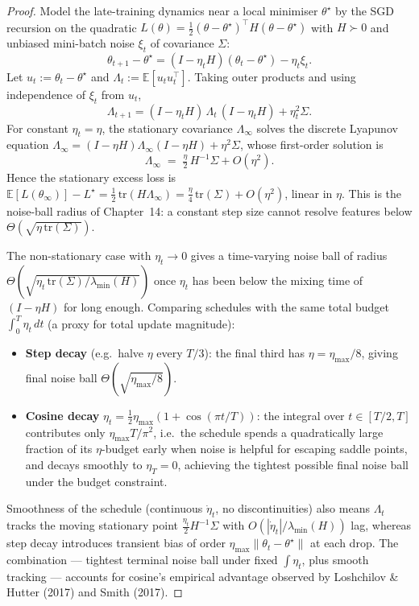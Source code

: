 \documentclass[11pt]{article}
\theoremstyle{remark}
\begin{document}
\begin{proof}
Model the late-training dynamics near a local minimiser $\theta^\star$ by the SGD recursion on the quadratic $L(\theta) = \tfrac{1}{2}(\theta - \theta^\star)^\top H (\theta - \theta^\star)$ with $H \succ 0$ and unbiased mini-batch noise $\xi_t$ of covariance $\Sigma$:
\[
  \theta_{t+1} - \theta^\star = (I - \eta_t H)(\theta_t - \theta^\star) - \eta_t \xi_t.
\]
Let $u_t := \theta_t - \theta^\star$ and $\Lambda_t := \mathbb{E}[u_t u_t^\top]$. Taking outer products and using independence of $\xi_t$ from $u_t$,
\[
  \Lambda_{t+1} = (I - \eta_t H)\, \Lambda_t\, (I - \eta_t H) + \eta_t^2 \Sigma.
\]
For constant $\eta_t = \eta$, the stationary covariance $\Lambda_\infty$ solves the discrete Lyapunov equation $\Lambda_\infty = (I-\eta H)\Lambda_\infty(I-\eta H) + \eta^2 \Sigma$, whose first-order solution is
\[
  \Lambda_\infty \;=\; \tfrac{\eta}{2}\, H^{-1} \Sigma + O(\eta^2).
\]
Hence the stationary excess loss is $\mathbb{E}[L(\theta_\infty)] - L^\star = \tfrac{1}{2}\,\mathrm{tr}(H \Lambda_\infty) = \tfrac{\eta}{4}\,\mathrm{tr}(\Sigma) + O(\eta^2)$, linear in $\eta$. This is the noise-ball radius of Chapter~14: a constant step size cannot resolve features below $\Theta(\sqrt{\eta\,\mathrm{tr}(\Sigma)})$.

The non-stationary case with $\eta_t \to 0$ gives a time-varying noise ball of radius $\Theta(\sqrt{\eta_t \,\mathrm{tr}(\Sigma) / \lambda_{\min}(H)})$ once $\eta_t$ has been below the mixing time of $(I - \eta H)$ for long enough. Comparing schedules with the same total budget $\int_0^T \eta_t \, dt$ (a proxy for total update magnitude):
\begin{itemize}
  \item \textbf{Step decay} (e.g.\ halve $\eta$ every $T/3$): the final third has $\eta = \eta_{\max}/8$, giving final noise ball $\Theta(\sqrt{\eta_{\max}/8})$.
  \item \textbf{Cosine decay} $\eta_t = \tfrac{1}{2}\eta_{\max}(1 + \cos(\pi t/T))$: the integral over $t \in [T/2, T]$ contributes only $\eta_{\max} T / \pi^2$, i.e.\ the schedule spends a quadratically large fraction of its $\eta$-budget early when noise is helpful for escaping saddle points, and decays smoothly to $\eta_T = 0$, achieving the tightest possible final noise ball under the budget constraint.
\end{itemize}
Smoothness of the schedule (continuous $\dot\eta_t$, no discontinuities) also means $\Lambda_t$ tracks the moving stationary point $\tfrac{\eta_t}{2} H^{-1}\Sigma$ with $O(|\dot\eta_t|/\lambda_{\min}(H))$ lag, whereas step decay introduces transient bias of order $\eta_{\max}\|\theta_t - \theta^\star\|$ at each drop. The combination --- tightest terminal noise ball under fixed $\int \eta_t$, plus smooth tracking --- accounts for cosine's empirical advantage observed by Loshchilov \& Hutter (2017) and Smith (2017).
\end{proof}
\end{document}
